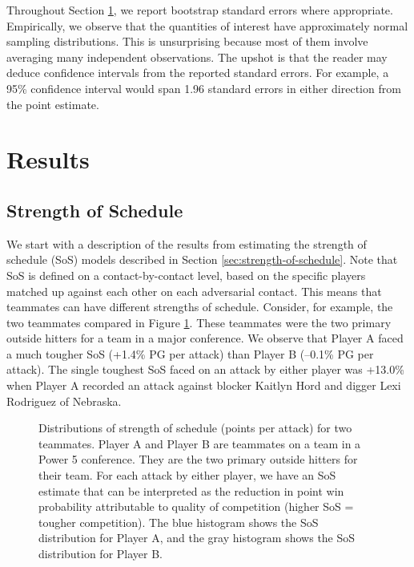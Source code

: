 \documentclass[USenglish]{article}
\theoremstyle{dgthm}
\theoremstyle{dgdef}
\begin{document}
Throughout Section \ref{sec:results}, we report bootstrap standard errors where appropriate. Empirically, we observe that the quantities of interest have approximately normal sampling distributions. This is unsurprising because most of them involve averaging many independent observations. The upshot is that the reader may deduce confidence intervals from the reported standard errors. For example, a 95\% confidence interval would span 1.96 standard errors in either direction from the point estimate.

\section{Results}
\label{sec:results}

\subsection{Strength of Schedule}

We start with a description of the results from estimating the strength of schedule (SoS) models described in Section \ref{sec:strength-of-schedule}. Note that SoS is defined on a contact-by-contact level, based on the specific players matched up against each other on each adversarial contact. This means that teammates can have different strengths of schedule. Consider, for example, the two teammates compared in Figure \ref{fig:teammate-comparison}. These teammates were the two primary outside hitters for a team in a major conference. We observe that Player A faced a much tougher SoS (+1.4\% PG per attack) than Player B (--0.1\% PG per attack). The single toughest SoS faced on an attack by either player was +13.0\% when Player A recorded an attack against blocker Kaitlyn Hord and digger Lexi Rodriguez of Nebraska.

\begin{figure}
    \centering
    \caption{Distributions of strength of schedule (points per attack) for two teammates. Player A and Player B are teammates on a team in a Power 5 conference. They are the two primary outside hitters for their team. For each attack by either player, we have an SoS estimate that can be interpreted as the reduction in point win probability attributable to quality of competition (higher SoS = tougher competition). The blue histogram shows the SoS distribution for Player A, and the gray histogram shows the SoS distribution for Player B.}
    \label{fig:teammate-comparison}
\end{figure}
\end{document}
